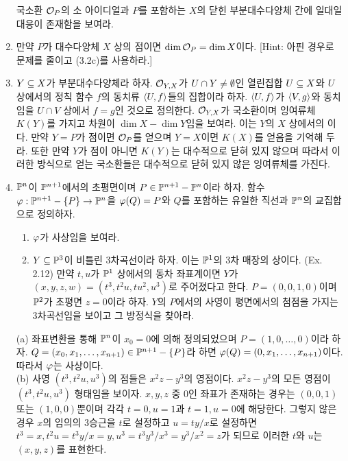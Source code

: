 \begin{enumerate}[label=\tb{3.\arabic*.},itemindent=0mm,itemsep=4mm]
		국소환 $\mathcal{O}_P$의 소 아이디얼과 $P$를 포함하는 $X$의 닫힌 부분대수다양체 간에 일대일 대응이 존재함을 보여라.\\
		\sol
		\item 만약 $P$가 대수다양체 $X$ 상의 점이면 $\dim\mathcal{O}_P=\dim X$이다. [Hint: 아핀 경우로 문제를 줄이고 (3.2c)를 사용하라.]\\
		\sol
		\item {} $Y\subseteq X$가 부분대수다양체라 하자.
		$\mathcal{O}_{Y,X}$가 $U\cap Y\ne\emptyset$인 열린집합 $U\subseteq X$와 $U$ 상에서의 정칙 함수 $f$의 동치류 $\Braket{U,f}$들의 집합이라 하자.
		$\Braket{U,f}$가 $\Braket{V,g}$와 동치임을 $U\cap V$ 상에서 $f=g$인 것으로 정의한다.
		$\mathcal{O}_{Y,X}$가 국소환이며 잉여류체 $K(Y)$를 가지고 차원이 $\dim X-\dim Y$임을 보여라.
		이는 $Y$의 $X$ 상에서의 이다.
		만약 $Y=P$가 점이면 $\mathcal{O}_P$를 얻으며 $Y=X$이면 $K(X)$를 얻음을 기억해 두라.
		또한 만약 $Y$가 점이 아니면 $K(Y)$는 대수적으로 닫혀 있지 않으며
		따라서 이러한 방식으로 얻는 국소환들은 대수적으로 닫혀 있지 않은 잉여류체를 가진다.\\
		\sol
		\item {} $\mathbb{P}^n$이 $\mathbb{P}^{n+1}$에서의 초평면이며 $P\in\mathbb{P}^{n+1}-\mathbb{P}^n$이라 하자.
		함수 $\varphi:\mathbb{P}^{n+1}-\{P\}\rightarrow\mathbb{P}^n$을 $\varphi(Q)=P$와 $Q$를 포함하는 유일한 직선과 $\mathbb{P}^n$의 교집합으로 정의하자.
		\begin{enumerate}[label=(\alph*)]
		\item $\varphi$가 사상임을 보여라.
		\item $Y\subseteq\mathbb{P}^3$이 비틀린 3차곡선이라 하자. 이는 $\mathbb{P}^1$의 3차 매장의 상이다. (Ex. 2.12)
		만약 $t,u$가 $\mathbb{P}^1$ 상에서의 동차 좌표계이면 $Y$가 
		$(x,y,z,w)=(t^3,t^2u,tu^2,u^3)$로 주어졌다고 한다. $P=(0,0,1,0)$이며 $\mathbb{P}^2$가 초평면 $z=0$이라 하자.
		$Y$의 $P$에서의 사영이 평면에서의 첨점을 가지는 3차곡선임을 보이고 그 방정식을 찾아라.
		\end{enumerate}
		\sol (a) 좌표변환을 통해 $\mathbb{P}^n$이 $x_0=0$에 의해 정의되었으며 $P=(1,0,\ldots,0)$이라 하자.
		$Q=(x_0,x_1,\ldots,x_{n+1})\in\mathbb{P}^{n+1}-\{P\}$라 하면 $\varphi(Q)=(0,x_1,\ldots,x_{n+1})$이다. 따라서 $\varphi$는 사상이다.\\
		(b) 사영 $(t^3,t^2u,u^3)$의 점들은 $x^2z-y^3$의 영점이다.
		$x^2z-y^3$의 모든 영점이 $(t^3,t^2u,u^3)$ 형태임을 보이자.
		$x,y,z$ 중 0인 좌표가 존재하는 경우는 $(0,0,1)$ 또는 $(1,0,0)$뿐이며 각각 $t=0,u=1$과 $t=1,u=0$에 해당한다.
		그렇지 않은 경우 $x$의 임의의 3승근을 $t$로 설정하고 $u=ty/x$로 설정하면
		$t^3=x,t^2u=t^3y/x=y,u^3=t^3y^3/x^3=y^3/x^2=z$가 되므로 이러한 $t$와 $u$는 $(x,y,z)$를 표현한다.

\end{enumerate}
